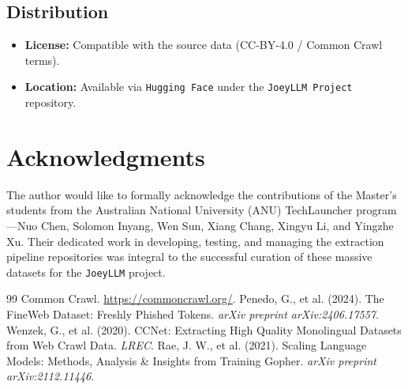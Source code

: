 \documentclass[11pt, a4paper]{article}
\begin{document}
\subsection{Distribution}
\begin{itemize}[noitemsep]
    \item \textbf{License:} Compatible with the source data (CC-BY-4.0 / Common Crawl terms).
    \item \textbf{Location:} Available via \texttt{Hugging Face} under the \texttt{JoeyLLM Project} repository.
\end{itemize}

\section*{Acknowledgments}

The author would like to formally acknowledge the contributions of the Master's students from the Australian National University (ANU) TechLauncher program---Nuo Chen, Solomon Inyang, Wen Sun, Xiang Chang, Xingyu Li, and Yingzhe Xu. Their dedicated work in developing, testing, and managing the extraction pipeline repositories was integral to the successful curation of these massive datasets for the \texttt{JoeyLLM} project.

\begin{thebibliography}{99}
 Common Crawl. \url{https://commoncrawl.org/}.
 Penedo, G., et al. (2024). The FineWeb Dataset: Freshly Phished Tokens. \textit{arXiv preprint arXiv:2406.17557}.
 Wenzek, G., et al. (2020). CCNet: Extracting High Quality Monolingual Datasets from Web Crawl Data. \textit{LREC}.
 Rae, J. W., et al. (2021). Scaling Language Models: Methods, Analysis \& Insights from Training Gopher. \textit{arXiv preprint arXiv:2112.11446}.
\end{thebibliography}
\end{document}
